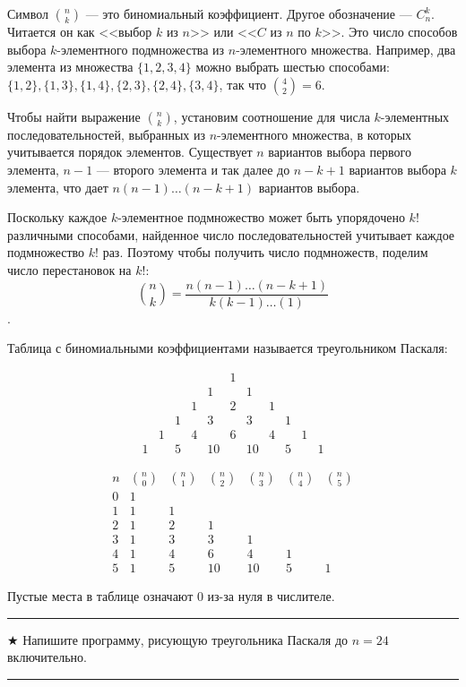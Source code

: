 \documentclass[14pt]{book}
\newenvironment{task}
 { \vspace{2ex}\hrule\vspace{2ex}$\bigstar$ }
 { \vspace{2ex}\hrule\vspace{2ex} }
\begin{document}
Символ $\binom{n}{k}$ --- это биномиальный коэффициент. Другое обозначение --- $C_n^k$.
Читается он как <<выбор $k$ из $n$>> или <<$C$ из $n$ по $k$>>. Это число способов выбора
$k$-элементного подмножества из $n$-элементного множества. Например, два элемента
из множества $\{1,2,3,4\}$ можно выбрать шестью способами: 
$\{1,2\}, \{1,3\}, \{1,4\}, \{2,3\}, \{2,4\}, \{3,4\}$, так что $\binom{4}{2}=6$.

Чтобы найти выражение $\binom{n}{k}$, установим соотношение для числа $k$-элементных
последовательностей, выбранных из $n$-элементного множества, в которых учитывается порядок
элементов. Существует $n$ вариантов выбора первого элемента, $n-1$ --- второго элемента
и так далее до $n-k+1$ вариантов выбора $k$ элемента, что дает $n(n-1)\ldots(n-k+1)$
вариантов выбора.

Поскольку каждое $k$-элементное подмножество может быть упорядочено $k!$ различными способами,
найденное число последовательностей учитывает каждое подмножество $k!$ раз. Поэтому чтобы
получить число подмножеств, поделим число перестановок на $k!$:
$$\binom{n}{k} = \frac{n(n-1)\ldots(n-k+1)}{k(k-1)\ldots(1)}$$.

Таблица с биномиальными коэффициентами называется треугольником Паскаля:

$$
 \begin{array}{ccccccccccc}
 &&&&& 1 \\
 &&&& 1 && 1 \\
 &&& 1 && 2 && 1 \\
 && 1 && 3 && 3 && 1 \\
 & 1 && 4 && 6 && 4 && 1 \\
 1 && 5 && 10 && 10 && 5 && 1
 \end{array}
$$

$$
 \begin{array}{ccccccc}
 n & \binom{n}{0} & \binom{n}{1} & \binom{n}{2} & \binom{n}{3} & \binom{n}{4} & \binom{n}{5} \\
 0 & 1 \\
 1 & 1 & 1 \\
 2 &  1 & 2 & 1 \\
 3 & 1 & 3 & 3 & 1 \\
 4 & 1 & 4 & 6 & 4 & 1 \\
 5 & 1 & 5 & 10 & 10 & 5 & 1
 \end{array}
$$

Пустые места в таблице означают $0$ из-за нуля в числителе.

\begin{task}
Напишите программу, рисующую треугольника Паскаля до $n=24$ включительно.
\end{task}
\end{document}
